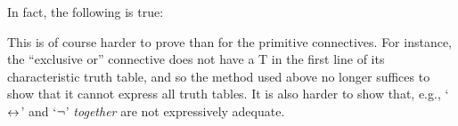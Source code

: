 In fact, the following is true:
        

This is of course harder to prove than for the primitive connectives. For instance, the ``exclusive or'' connective does not have a T in the first line of its characteristic truth table, and so the method used above no longer suffices to show that it cannot express all truth tables.  It is also harder to show that, e.g., `$\leftrightarrow$' and `$\neg$' \emph{together} are not expressively adequate.
		


